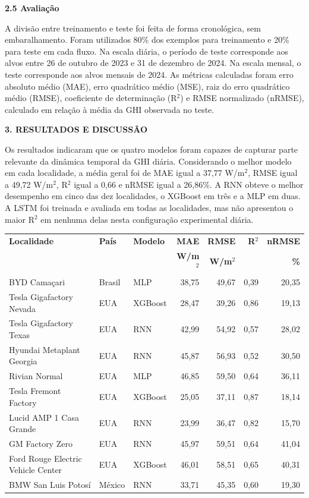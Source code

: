 \documentclass[12pt,a4paper]{article}
\begin{document}
\vspace{12pt}

\noindent\textbf{2.5 Avaliação}

A divisão entre treinamento e teste foi feita de forma cronológica, sem embaralhamento. Foram utilizados 80\% dos exemplos para treinamento e 20\% para teste em cada fluxo. Na escala diária, o período de teste corresponde aos alvos entre 26 de outubro de 2023 e 31 de dezembro de 2024. Na escala mensal, o teste corresponde aos alvos mensais de 2024. As métricas calculadas foram erro absoluto médio (MAE), erro quadrático médio (MSE), raiz do erro quadrático médio (RMSE), coeficiente de determinação (R$^2$) e RMSE normalizado (nRMSE), calculado em relação à média da GHI observada no teste.

\vspace{12pt}

\noindent\textbf{3. RESULTADOS E DISCUSSÃO}

Os resultados indicaram que os quatro modelos foram capazes de capturar parte relevante da dinâmica temporal da GHI diária. Considerando o melhor modelo em cada localidade, a média geral foi de MAE igual a 37,77 W/m$^2$, RMSE igual a 49,72 W/m$^2$, R$^2$ igual a 0,66 e nRMSE igual a 26,86\%. A RNN obteve o melhor desempenho em cinco das dez localidades, o XGBoost em três e a MLP em duas. A LSTM foi treinada e avaliada em todas as localidades, mas não apresentou o maior R$^2$ em nenhuma delas nesta configuração experimental diária.

\vspace{6pt}

\begin{center}
\small
\begin{tabular}{p{5.2cm}p{1.6cm}p{1.9cm}rrrr}
\toprule
\textbf{Localidade} & \textbf{País} & \textbf{Modelo} & \textbf{MAE} & \textbf{RMSE} & \textbf{R$^2$} & \textbf{nRMSE} \\
 & & & \textbf{W/m$^2$} & \textbf{W/m$^2$} & & \textbf{\%} \\
\midrule
BYD Camaçari & Brasil & MLP & 38,75 & 49,67 & 0,39 & 20,35 \\
Tesla Gigafactory Nevada & EUA & XGBoost & 28,47 & 39,26 & 0,86 & 19,13 \\
Tesla Gigafactory Texas & EUA & RNN & 42,99 & 54,92 & 0,57 & 28,02 \\
Hyundai Metaplant Georgia & EUA & RNN & 45,87 & 56,93 & 0,52 & 30,50 \\
Rivian Normal & EUA & MLP & 46,85 & 59,50 & 0,64 & 36,11 \\
Tesla Fremont Factory & EUA & XGBoost & 25,05 & 37,11 & 0,87 & 18,14 \\
Lucid AMP 1 Casa Grande & EUA & RNN & 23,99 & 36,47 & 0,82 & 15,70 \\
GM Factory Zero & EUA & RNN & 45,97 & 59,51 & 0,64 & 41,04 \\
Ford Rouge Electric Vehicle Center & EUA & XGBoost & 46,01 & 58,51 & 0,65 & 40,31 \\
BMW San Luis Potosí & México & RNN & 33,71 & 45,35 & 0,60 & 19,30 \\
\bottomrule
\end{tabular}
\end{center}
\end{document}
